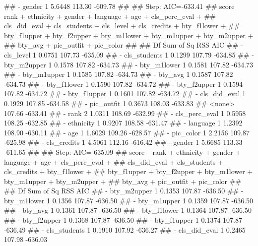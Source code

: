 \documentclass[]{article}
\newenvironment{Shaded}{\begin{snugshade}}{\end{snugshade}}
\newcommand{\NormalTok}[1]{#1}
\begin{document}
\begin{Shaded}
\begin{Highlighting}[]
\NormalTok{## - gender         1    5.6448 113.30 -609.78}
\NormalTok{## }
\NormalTok{## Step:  AIC=-633.41}
\NormalTok{## score ~ rank + ethnicity + gender + language + age + cls_perc_eval + }
\NormalTok{##     cls_did_eval + cls_students + cls_level + cls_credits + bty_f1lower + }
\NormalTok{##     bty_f1upper + bty_f2upper + bty_m1lower + bty_m1upper + bty_m2upper + }
\NormalTok{##     bty_avg + pic_outfit + pic_color}
\NormalTok{## }
\NormalTok{##                 Df Sum of Sq    RSS     AIC}
\NormalTok{## - cls_level      1    0.0751 107.73 -635.09}
\NormalTok{## - cls_students   1    0.1299 107.79 -634.85}
\NormalTok{## - bty_m2upper    1    0.1578 107.82 -634.73}
\NormalTok{## - bty_m1lower    1    0.1581 107.82 -634.73}
\NormalTok{## - bty_m1upper    1    0.1585 107.82 -634.73}
\NormalTok{## - bty_avg        1    0.1587 107.82 -634.73}
\NormalTok{## - bty_f1lower    1    0.1590 107.82 -634.72}
\NormalTok{## - bty_f2upper    1    0.1594 107.82 -634.72}
\NormalTok{## - bty_f1upper    1    0.1601 107.82 -634.72}
\NormalTok{## - cls_did_eval   1    0.1929 107.85 -634.58}
\NormalTok{## - pic_outfit     1    0.3673 108.03 -633.83}
\NormalTok{## <none>                       107.66 -633.41}
\NormalTok{## - rank           2    1.0311 108.69 -632.99}
\NormalTok{## - cls_perc_eval  1    0.5958 108.25 -632.85}
\NormalTok{## - ethnicity      1    0.9207 108.58 -631.47}
\NormalTok{## - language       1    1.2392 108.90 -630.11}
\NormalTok{## - age            1    1.6029 109.26 -628.57}
\NormalTok{## - pic_color      1    2.2156 109.87 -625.98}
\NormalTok{## - cls_credits    1    4.5061 112.16 -616.42}
\NormalTok{## - gender         1    5.6685 113.33 -611.65}
\NormalTok{## }
\NormalTok{## Step:  AIC=-635.09}
\NormalTok{## score ~ rank + ethnicity + gender + language + age + cls_perc_eval + }
\NormalTok{##     cls_did_eval + cls_students + cls_credits + bty_f1lower + }
\NormalTok{##     bty_f1upper + bty_f2upper + bty_m1lower + bty_m1upper + bty_m2upper + }
\NormalTok{##     bty_avg + pic_outfit + pic_color}
\NormalTok{## }
\NormalTok{##                 Df Sum of Sq    RSS     AIC}
\NormalTok{## - bty_m2upper    1    0.1353 107.87 -636.50}
\NormalTok{## - bty_m1lower    1    0.1356 107.87 -636.50}
\NormalTok{## - bty_m1upper    1    0.1359 107.87 -636.50}
\NormalTok{## - bty_avg        1    0.1361 107.87 -636.50}
\NormalTok{## - bty_f1lower    1    0.1364 107.87 -636.50}
\NormalTok{## - bty_f2upper    1    0.1368 107.87 -636.50}
\NormalTok{## - bty_f1upper    1    0.1374 107.87 -636.49}
\NormalTok{## - cls_students   1    0.1910 107.92 -636.27}
\NormalTok{## - cls_did_eval   1    0.2465 107.98 -636.03}

\end{Highlighting}
\end{Shaded}
\end{document}
